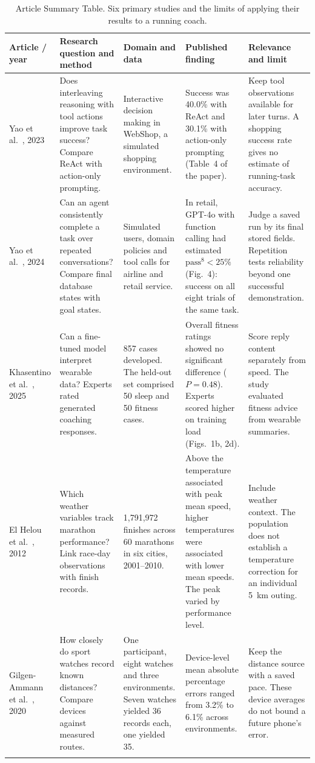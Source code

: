 \documentclass[conference]{IEEEtran}
\begin{document}
\begin{table}[t]
\caption{Article Summary Table. Six primary studies and the limits of applying their results to a running coach.}
\label{tab:papers}\centering\small
\renewcommand{\arraystretch}{1.10}
\begin{tabularx}{\textwidth}{@{}p{2.10cm}YYYY@{}}\toprule
Article / year & Research question and method & Domain and data & Published finding & Relevance and limit\\\midrule
Yao et al.~\cite{react}, 2023 & Does interleaving reasoning with tool actions improve task success? Compare ReAct with action-only prompting. & Interactive decision making in WebShop, a simulated shopping environment. & Success was 40.0\% with ReAct and 30.1\% with action-only prompting (Table~4 of the paper). & Keep tool observations available for later turns. A shopping success rate gives no estimate of running-task accuracy.\\\addlinespace
Yao et al.~\cite{tau}, 2024 & Can an agent consistently complete a task over repeated conversations? Compare final database states with goal states. & Simulated users, domain policies and tool calls for airline and retail service. & In retail, GPT-4o with function calling had estimated $\mathrm{pass}^{8}<25\%$ (Fig.~4): success on all eight trials of the same task. & Judge a saved run by its final stored fields. Repetition tests reliability beyond one successful demonstration.\\\addlinespace
Khasentino et al.~\cite{phllm}, 2025 & Can a fine-tuned model interpret wearable data? Experts rated generated coaching responses. & 857 cases developed. The held-out set comprised 50 sleep and 50 fitness cases. & Overall fitness ratings showed no significant difference ($P=0.48$). Experts scored higher on training load (Figs.~1b, 2d). & Score reply content separately from speed. The study evaluated fitness advice from wearable summaries.\\\addlinespace
El Helou et al.~\cite{heat}, 2012 & Which weather variables track marathon performance? Link race-day observations with finish records. & 1,791,972 finishes across 60 marathons in six cities, 2001--2010. & Above the temperature associated with peak mean speed, higher temperatures were associated with lower mean speeds. The peak varied by performance level. & Include weather context. The population does not establish a temperature correction for an individual 5~km outing.\\\addlinespace
Gilgen-Ammann et al.~\cite{gnss}, 2020 & How closely do sport watches record known distances? Compare devices against measured routes. & One participant, eight watches and three environments. Seven watches yielded 36 records each, one yielded 35. & Device-level mean absolute percentage errors ranged from 3.2\% to 6.1\% across environments. & Keep the distance source with a saved pace. These device averages do not bound a future phone's error.\\\addlinespace

\end{tabularx}
\end{table}
\end{document}
